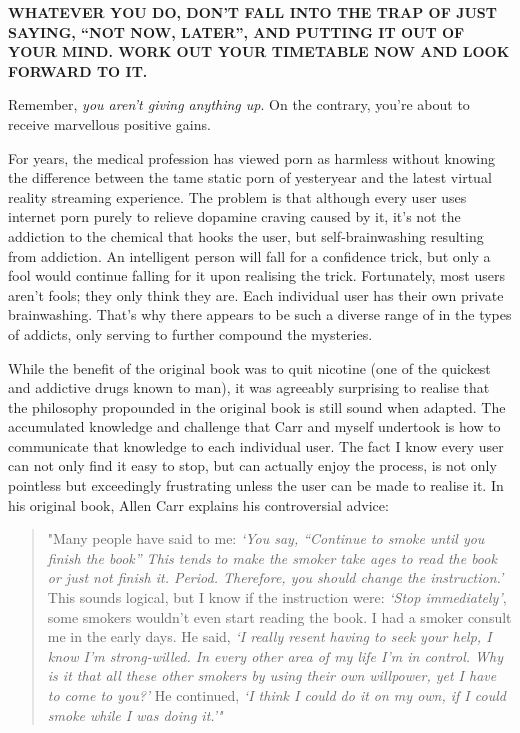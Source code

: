 \documentclass[
]{book}
\begin{document}
\textbf{WHATEVER YOU DO, DON'T FALL INTO THE TRAP OF JUST SAYING, ``NOT NOW, LATER'', AND PUTTING IT OUT OF YOUR MIND. WORK OUT YOUR TIMETABLE NOW AND LOOK FORWARD TO IT.}

Remember, \emph{you aren't giving anything up}. On the contrary, you're about to receive marvellous positive gains.

For years, the medical profession has viewed porn as harmless without knowing the difference between the tame static porn of yesteryear and the latest virtual reality streaming experience. The problem is that although every user uses internet porn purely to relieve dopamine craving caused by it, it's not the addiction to the chemical that hooks the user, but self-brainwashing resulting from addiction. An intelligent person will fall for a confidence trick, but only a fool would continue falling for it upon realising the trick. Fortunately, most users aren't fools; they only think they are. Each individual user has their own private brainwashing. That's why there appears to be such a diverse range of in the types of addicts, only serving to further compound the mysteries.

While the benefit of the original book was to quit nicotine (one of the quickest and addictive drugs known to man), it was agreeably surprising to realise that the philosophy propounded in the original book is still sound when adapted. The accumulated knowledge and challenge that Carr and myself undertook is how to communicate that knowledge to each individual user. The fact I know every user can not only find it easy to stop, but can actually enjoy the process, is not only pointless but exceedingly frustrating unless the user can be made to realise it. In his original book, Allen Carr explains his controversial advice:

\begin{quote}
"Many people have said to me: \emph{`You say, ``Continue to smoke until you finish the book'' This tends to make the smoker take ages to read the book or just not finish it. Period. Therefore, you should change the instruction.'} This sounds logical, but I know if the instruction were: \emph{`Stop immediately'}, some smokers wouldn't even start reading the book. I had a smoker consult me in the early days. He said, \emph{`I really resent having to seek your help, I know I'm strong-willed. In every other area of my life I'm in control. Why is it that all these other smokers by using their own willpower, yet I have to come to you?'} He continued, \emph{`I think I could do it on my own, if I could smoke while I was doing it.'"}
\end{quote}
\end{document}
